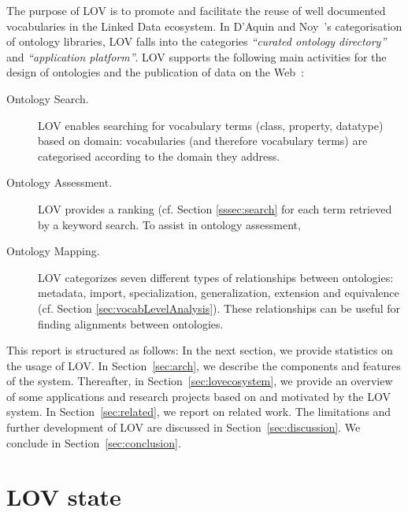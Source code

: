 \documentclass{iosart2c}
\begin{document}
The purpose of LOV is to promote and facilitate the reuse of well documented vocabularies in the Linked Data ecosystem. In D'Aquin and Noy~\cite{AquinJoWS12}'s categorisation of ontology libraries, LOV falls into the categories \textit{``curated ontology directory''}  and \textit{``application platform''}.  LOV supports the following main activities for the design of ontologies and the publication of data on the Web~\cite{MC10, ohdeploying, pedrinaci2014, villata2012}:

\begin{description}
 \item [Ontology Search.] LOV enables searching for vocabulary terms (class, property, datatype) based on domain: vocabularies (and therefore vocabulary terms) are categorised according to the domain they address.
 \item [Ontology Assessment.] LOV provides a ranking (cf. Section \ref{sssec:search} for each term retrieved by a keyword search. To assist in ontology assessment, 
 \item [Ontology Mapping.] LOV categorizes seven different types of relationships between ontologies: metadata, import, specialization, generalization, extension and equivalence (cf. Section \ref{sec:vocabLevelAnalysis}). These relationships can be useful for finding alignments between ontologies. 
\end{description}

This report is structured as follows: In the next section, we provide statistics on the usage of LOV. In Section~\ref{sec:arch}, we describe the components and features of the system. Thereafter, in Section~\ref{sec:lovecosystem}, we provide an overview of some applications and research projects based on and motivated by the LOV system. In Section~\ref{sec:related}, we report on related work. The limitations and further development of LOV are discussed in Section~\ref{sec:discussion}. We conclude in Section~\ref{sec:conclusion}.


\section{LOV state}\label{sec:state}
\end{document}
